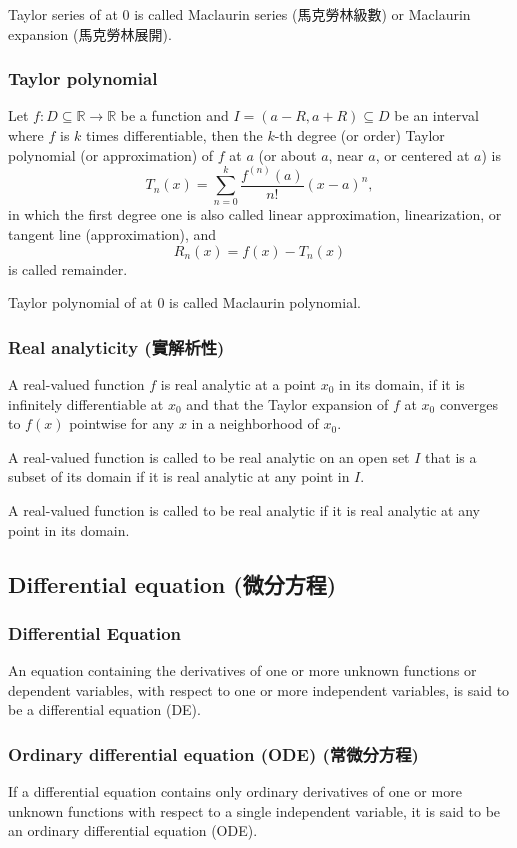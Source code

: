 Taylor series of at $0$ is called Maclaurin series (馬克勞林級數) or Maclaurin expansion (馬克勞林展開).
\subsubsection{Taylor polynomial}
Let $f\colon D\subseteq\mathbb{R}\to\mathbb{R}$ be a function and $I=(a-R,a+R)\subseteq D$ be an interval where $f$ is $k$ times differentiable, then the $k$-th degree (or order) Taylor polynomial (or approximation) of $f$ at $a$ (or about $a$, near $a$, or centered at $a$) is
\[T_n(x)=\sum_{n=0}^k\frac{f^{(n)}(a)}{n!}(x-a)^n,\]
in which the first degree one is also called linear approximation, linearization, or tangent line (approximation), and
\[R_n(x)=f(x)-T_n(x)\]
is called remainder.

Taylor polynomial of at $0$ is called Maclaurin polynomial.
\subsubsection{Real analyticity (實解析性)}
A real-valued function $f$ is real analytic at a point $x_0$ in its domain, if it is infinitely differentiable at $x_0$ and that the Taylor expansion of $f$ at $x_0$ converges to $f(x)$ pointwise for any $x$ in a neighborhood of $x_0$.

A real-valued function is called to be real analytic on an open set $I$ that is a subset of its domain if it is real analytic at any point in $I$.

A real-valued function is called to be real analytic if it is real analytic at any point in its domain.
\subsection{Differential equation (微分方程)}
\subsubsection{Differential Equation}
An equation containing the derivatives of one or more unknown functions or dependent variables, with respect to one or more independent variables, is said to be a differential equation (DE).
\subsubsection{Ordinary differential equation (ODE) (常微分方程)}
If a differential equation contains only ordinary derivatives of one or more unknown functions with respect to a single independent variable, it is said to be an ordinary differential equation (ODE).
